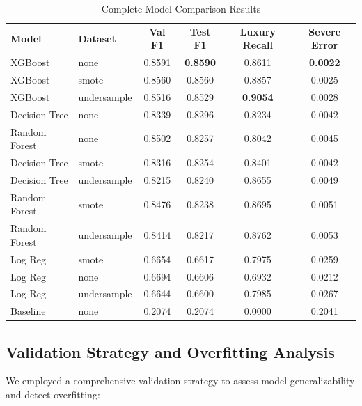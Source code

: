 \documentclass[12pt, a4paper]{article}
\begin{document}
\begin{table}[ht]
\centering
\caption{Complete Model Comparison Results}
\label{tab:full_model_comparison}
\renewcommand{\arraystretch}{1.3}
\begin{tabular}{l l c c c c}
\rowcolor{slate}
{\color{white}\small\bfseries Model} &
{\color{white}\small\bfseries Dataset} &
{\color{white}\small\bfseries Val F1} &
{\color{white}\small\bfseries Test F1} &
{\color{white}\small\bfseries Luxury Recall} &
{\color{white}\small\bfseries Severe Error} \\
\rowcolor{lightgray}
XGBoost & none & 0.8591 & \textbf{0.8590} & 0.8611 & \textbf{0.0022} \\
\rowcolor{white}
XGBoost & smote & 0.8560 & 0.8560 & 0.8857 & 0.0025 \\
\rowcolor{lightgray}
XGBoost & undersample & 0.8516 & 0.8529 & \textbf{0.9054} & 0.0028 \\
\rowcolor{white}
Decision Tree & none & 0.8339 & 0.8296 & 0.8234 & 0.0042 \\
\rowcolor{lightgray}
Random Forest & none & 0.8502 & 0.8257 & 0.8042 & 0.0045 \\
\rowcolor{white}
Decision Tree & smote & 0.8316 & 0.8254 & 0.8401 & 0.0042 \\
\rowcolor{lightgray}
Decision Tree & undersample & 0.8215 & 0.8240 & 0.8655 & 0.0049 \\
\rowcolor{white}
Random Forest & smote & 0.8476 & 0.8238 & 0.8695 & 0.0051 \\
\rowcolor{lightgray}
Random Forest & undersample & 0.8414 & 0.8217 & 0.8762 & 0.0053 \\
\rowcolor{white}
Log Reg & smote & 0.6654 & 0.6617 & 0.7975 & 0.0259 \\
\rowcolor{lightgray}
Log Reg & none & 0.6694 & 0.6606 & 0.6932 & 0.0212 \\
\rowcolor{white}
Log Reg & undersample & 0.6644 & 0.6600 & 0.7985 & 0.0267 \\
\rowcolor{lightgray}
Baseline & none & 0.2074 & 0.2074 & 0.0000 & 0.2041 \\
\end{tabular}
\end{table}

\subsection{Validation Strategy and Overfitting Analysis}
We employed a comprehensive validation strategy to assess model generalizability and detect overfitting:
\end{document}
